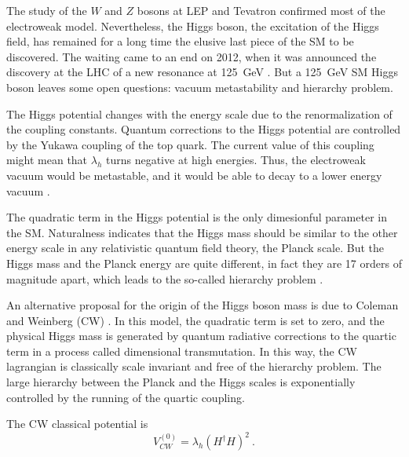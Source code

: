 \documentclass[aps,prd,preprintnumbers,nofootinbibn,twocolumn]{revtex4}
\begin{document}
The study of the $W$ and $Z$ bosons at LEP and Tevatron confirmed most of the electroweak model. Nevertheless, the Higgs boson, the excitation of the Higgs field, has remained for a long time the elusive last piece of the SM to be discovered. The waiting came to an end on 2012, when it was announced the discovery at the LHC  of a new resonance at \SI{125}{\giga\electronvolt} \cite{Aad:2012tfa,Chatrchyan:2012xdj}. But a \SI{125}{\giga\electronvolt} SM Higgs boson leaves some open questions: vacuum metastability and hierarchy problem.

The Higgs potential changes with the energy scale due to the renormalization of the coupling constants. Quantum corrections to the Higgs potential are controlled by the Yukawa coupling of the top quark. The current value of this coupling might mean that $\lambda_h$ turns negative at high energies. Thus, the electroweak vacuum would be metastable, and it would be able to decay to a lower energy vacuum \cite{EliasMiro:2011aa}.

The quadratic term in the Higgs potential is the only dimesionful parameter in the SM. Naturalness indicates that the Higgs mass should be similar to the other energy scale in any relativistic quantum field theory, the Planck scale. But the Higgs mass and the Planck energy are quite different, in fact they are 17 orders of magnitude apart, which leads to the so-called hierarchy problem \cite{Iso:2013aqa}.

An alternative proposal for the origin of the Higgs boson mass is due to Coleman and Weinberg (CW) \cite{Coleman:1973jx}. In this model, the quadratic term is set to zero, and the physical Higgs mass is generated by quantum radiative corrections to the quartic term in a process called dimensional transmutation. In this way, the CW lagrangian is classically scale invariant and free of the hierarchy problem. The large hierarchy between the Planck and the Higgs scales is exponentially controlled by the running of the quartic coupling.

The CW classical potential is
\begin{equation}
V_{CW}^{(0)} = \lambda_h (H^\dagger H)^2\ .
\end{equation}
\end{document}
